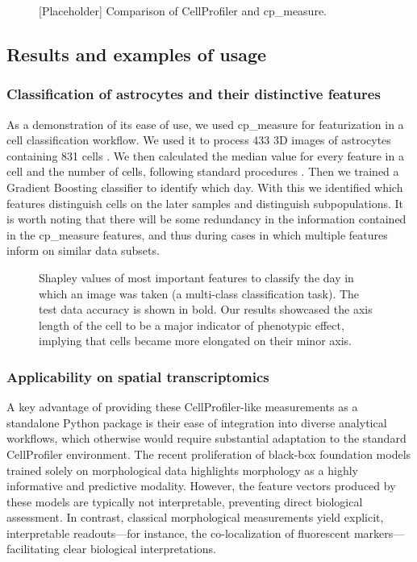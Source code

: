 \documentclass{article}
\begin{document}
\begin{figure}[htbp]
\centering

\caption{\label{fig:org7fe862f}{[}Placeholder] Comparison of CellProfiler and cp\_measure.}
\end{figure}
\subsection{Results and examples of usage}
\label{sec:org8ef524e}
\subsubsection{Classification of astrocytes and their distinctive features}
\label{sec:org3d97e6f}

As a demonstration of its ease of use, we used cp\_measure for featurization in a cell classification workflow. We used it to process 433 3D images of astrocytes containing 831 cells \citep{kalinin3DCellNuclear2018}. We then calculated the median value for every feature in a cell and the number of cells, following standard procedures \citep{caicedoDataanalysisStrategiesImagebased2017}. Then we trained a Gradient Boosting classifier to identify which day. With this we identified which features distinguish cells on the later samples and distinguish subpopulations. It is worth noting that there will be some redundancy in the information contained in the cp\_measure features, and thus during cases in which multiple features inform on similar data subsets.

\begin{figure}[htbp]
\centering

\caption{\label{fig:org4620d4d}Shapley values of most important features to classify the day in which an image was taken (a multi-class classification task). The test data accuracy is shown in bold. Our results showcased the axis length of the cell to be a major indicator of phenotypic effect, implying that cells became more elongated on their minor axis.}
\end{figure}
\subsubsection{Applicability on spatial transcriptomics}
\label{sec:org1d0d8b8}
A key advantage of providing these CellProfiler-like measurements as a standalone Python package is their ease of integration into diverse analytical workflows, which otherwise would require substantial adaptation to the standard CellProfiler environment. The recent proliferation of black-box foundation models trained solely on morphological data highlights morphology as a highly informative and predictive modality. However, the feature vectors produced by these models are typically not interpretable, preventing direct biological assessment. In contrast, classical morphological measurements yield explicit, interpretable readouts—for instance, the co-localization of fluorescent markers—facilitating clear biological interpretations.
\end{document}
